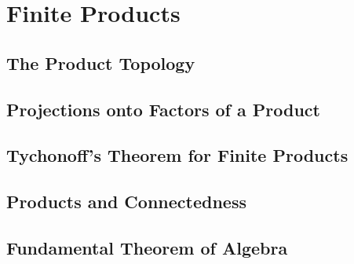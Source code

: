 \chapter{Finite Products}

\section{The Product Topology}



\section{Projections onto Factors of a Product}



\section{Tychonoff's Theorem for Finite Products}



\section{Products and Connectedness}



\section{Fundamental Theorem of Algebra}


